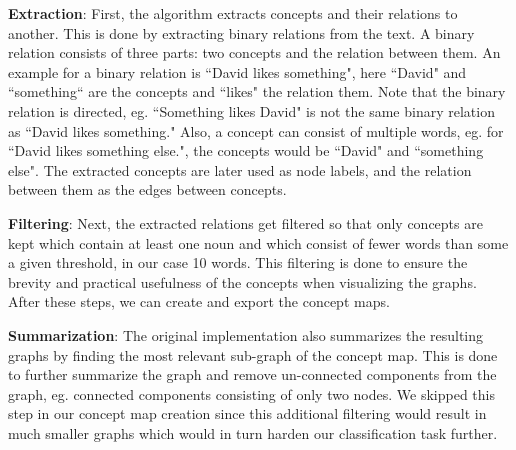 \textbf{Extraction}:
First, the algorithm extracts concepts and their relations to another.
This is done by extracting binary relations from the text. A binary relation consists of three parts: two concepts and the relation between them. An example for a binary relation is ``David likes something", here ``David" and ``something`` are the concepts and ``likes" the relation them. Note that the binary relation is directed, eg. ``Something likes David" is not the same binary relation as ``David likes something."
Also, a concept can consist of multiple words, eg. for ``David likes something else.", the concepts would be ``David" and ``something else".
The extracted concepts are later used as node labels, and the relation between them as the edges between concepts.

\textbf{Filtering}:
Next, the extracted relations get filtered so that only concepts are kept which contain at least one noun and which consist of fewer words than some a given threshold, in our case 10 words. This filtering is done to ensure the brevity and practical usefulness of the concepts when visualizing the graphs.
After these steps, we can create and export the concept maps.

\textbf{Summarization}:
The original implementation also summarizes the resulting graphs by finding the most relevant sub-graph of the concept map.
This is done to further summarize the graph and remove un-connected components from the graph, eg. connected components consisting of only two nodes.
We skipped this step in our concept map creation since this additional filtering would result in much smaller graphs which would in turn harden our classification task further.